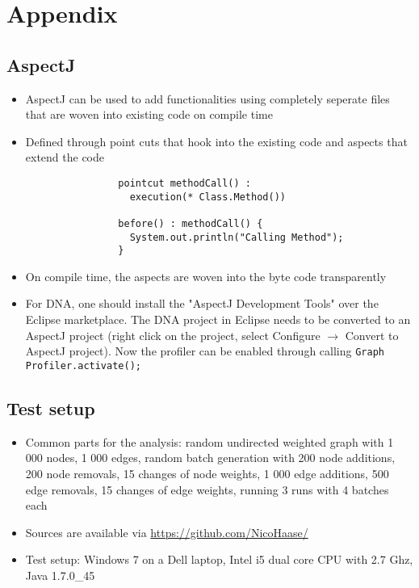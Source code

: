 \section{Appendix}
\subsection{AspectJ} \label{sec:aspectj}
	\begin{itemize}
		\item AspectJ can be used to add functionalities using completely
			seperate files that are woven into existing code on compile time
		\item Defined through point cuts that hook into the existing code and aspects that
			extend the code
	
			\begin{verbatim}
				pointcut methodCall() :
				  execution(* Class.Method())
				  
				before() : methodCall() {
				  System.out.println("Calling Method");
				}
			\end{verbatim}
		
		\item On compile time, the aspects are woven into the byte code transparently
		\item For DNA, one should install the "AspectJ Development Tools" over the Eclipse
			marketplace. The DNA project in Eclipse needs to be converted to an AspectJ project
			(right click on the project, select Configure $\rightarrow$ Convert to AspectJ
			project). Now the profiler can be enabled through calling \texttt{Graph\allowbreak
			Profiler.\allowbreak activate();}
		
	\end{itemize}
\subsection{Test setup} \label{sec:testSetup}
	\begin{itemize}
		\item Common parts for the analysis: random undirected weighted graph with 1 000 nodes, 1 000 edges, random
			batch generation with 200 node additions, 200 node removals, 15 changes of node weights,
			1 000 edge additions, 500 edge removals, 15 changes of edge weights, running 3 runs
			with 4 batches each
		\item Sources are available via \url{https://github.com/NicoHaase/}
		\item Test setup: Windows 7 on a Dell laptop, Intel i5 dual core CPU with 2.7 Ghz, Java
			1.7.0\_45
	\end{itemize}